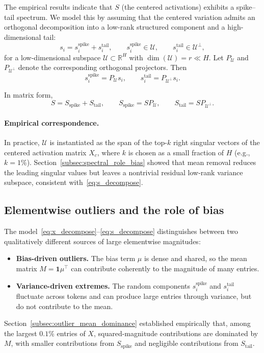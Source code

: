 The empirical results indicate that $S$ (the centered activations) exhibits a
spike--tail spectrum.
We model this by assuming that the centered variation admits an orthogonal
decomposition into a low-rank structured component and a high-dimensional tail:
\begin{equation}
\label{eq:s_decompose}
s_i = s_i^{\text{spike}} + s_i^{\text{tail}},
\qquad
s_i^{\text{spike}} \in \mathcal{U},
\qquad
s_i^{\text{tail}} \in \mathcal{U}^\perp,
\end{equation}
for a low-dimensional subspace $\mathcal{U}\subset\mathbb{R}^H$ with
$\dim(\mathcal{U})=r \ll H$.
Let $P_{\mathcal{U}}$ and $P_{\mathcal{U}^\perp}$ denote the corresponding
orthogonal projectors. Then
\[
s_i^{\text{spike}} = P_{\mathcal{U}}s_i,
\qquad
s_i^{\text{tail}}  = P_{\mathcal{U}^\perp}s_i.
\]

In matrix form,
\[
S = S_{\text{spike}} + S_{\text{tail}},
\qquad
S_{\text{spike}} = SP_{\mathcal{U}},
\qquad
S_{\text{tail}} = SP_{\mathcal{U}^\perp}.
\]

\paragraph{Empirical correspondence.}
In practice, $\mathcal{U}$ is instantiated as the span of the top-$k$ right singular
vectors of the centered activation matrix $X_c$, where $k$ is chosen as a small
fraction of $H$ (e.g., $k=1\%$).
Section~\ref{subsec:spectral_role_bias} showed that mean removal reduces the
leading singular values but leaves a nontrivial residual low-rank variance
subspace, consistent with~\eqref{eq:s_decompose}.

\subsection{Elementwise outliers and the role of bias}
\label{subsec:model_outliers}

The model~\eqref{eq:x_decompose}--\eqref{eq:s_decompose} distinguishes between
two qualitatively different sources of large elementwise magnitudes:
\begin{itemize}
\item \textbf{Bias-driven outliers.} The bias term $\mu$ is dense and shared,
so the mean matrix $M=\mathbf{1}\mu^\top$ can contribute coherently to the
magnitude of many entries.
\item \textbf{Variance-driven extremes.} The random components
$s_i^{\text{spike}}$ and $s_i^{\text{tail}}$ fluctuate across tokens and can
produce large entries through variance, but do not contribute to the mean.
\end{itemize}
Section~\ref{subsec:outlier_mean_dominance} established empirically that, among
the largest $0.1\%$ entries of $X$, squared-magnitude contributions are dominated
by $M$, with smaller contributions from $S_{\text{spike}}$ and negligible
contributions from $S_{\text{tail}}$.

